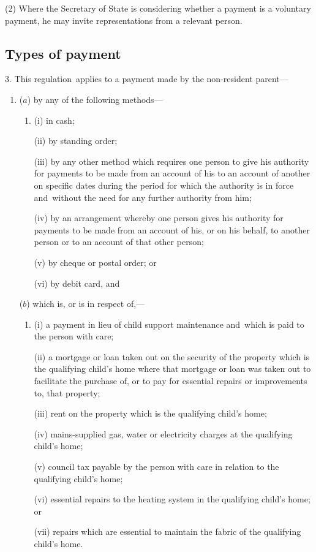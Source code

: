 \documentclass[12pt,a4paper]{article}
\begin{document}
(2) Where the Secretary of State is considering whether a payment is a voluntary payment, he may invite representations from a relevant person.


\subsection[3. Types of payment]{Types of payment}

3.  This regulation~applies to a payment made by the non-resident parent—
\begin{enumerate}\item[]
($a$) by any of the following methods—
\begin{enumerate}\item[]
(i) in cash;

(ii) by standing order;

(iii) by any other method which requires one person to give his authority for payments to be made from an account of his to an account of another on specific dates during the period for which the authority is in force and~without the need for any further authority from him;

(iv) by an arrangement whereby one person gives his authority for payments to be made from an account of his, or on his behalf, to another person or to an account of that other person;

(v) by cheque or postal order; or

(vi) by debit card, and
\end{enumerate}

($b$) which is, or is in respect of,—
\begin{enumerate}\item[]
(i) a payment in lieu of child support maintenance and~which is paid to the person with care;

(ii) a mortgage or loan taken out on the security of the property which is the qualifying child’s home where that mortgage or loan was taken out to facilitate the purchase of, or to pay for essential repairs or improvements to, that property;

(iii) rent on the property which is the qualifying child’s home;

(iv) mains-supplied gas, water or electricity charges at the qualifying child’s home;

(v) council tax payable by the person with care in relation to the qualifying child’s home;

(vi) essential repairs to the heating system in the qualifying child’s home; or

(vii) repairs which are essential to maintain the fabric of the qualifying child’s home.
\end{enumerate}
\end{enumerate}
\end{document}
